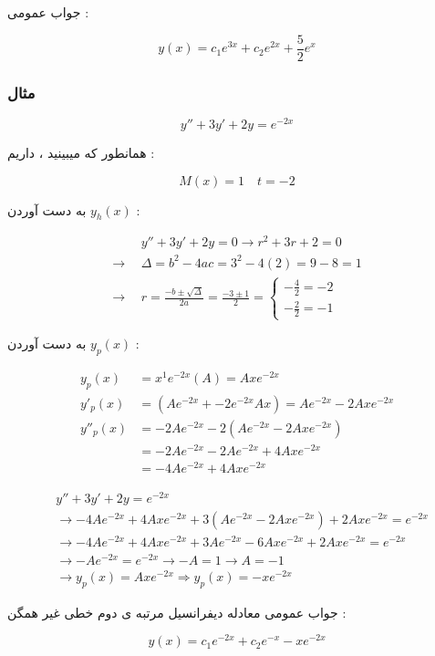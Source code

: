 \documentclass[12pt]{book}
\begin{document}
جواب عمومی :

$$
y(x) = c_{1}e^{3x} + c_{2}e^{2x} + \frac{5}{2}e^{x}
$$


\subsubsection{مثال}


$$
y'' + 3y' + 2y = e^{-2x} 
$$

همانطور که میبینید ، داریم : 

$$
M(x) = 1 \quad t = -2
$$

به دست آوردن 
$y_{h}(x)$ :


\begin{align*}
&y'' + 3y' + 2y = 0 \to r^{2} + 3r + 2 = 0 \\
\to \:\: &\Delta = b^{2} - 4ac = 3^{2} - 4(2) = 9 - 8 = 1 \\
\to \:\: &r = \frac{ -b \pm \sqrt{\Delta} }{ 2a } = \frac{-3 \pm 1}{2} = \begin{cases}
- \frac{4}{2} = -2 \\
- \frac{2}{2} = -1 
\end{cases}
\end{align*}


به دست آوردن 
$y_{p}(x)$ :

\begin{align*}
y_{p}(x) &= x^{1} e^{-2x} ( A ) = Axe^{-2x} \\
y'_{p}(x) &= (Ae^{-2x} + -2e^{-2x} Ax) = Ae^{-2x} - 2Axe^{-2x} \\
y''_{p}(x) &= -2Ae^{-2x} - 2 ( Ae^{-2x} - 2 Axe^{-2x}) \\
& = -2Ae^{-2x} - 2 A e^{-2x} + 4Axe^{-2x} \\
& = -4A e^{-2x} + 4Axe^{-2x} 
\end{align*}


\begin{align*}
&y'' + 3y' + 2y = e^{-2x} \\
&\to -4Ae^{-2x} + 4Axe^{-2x} + 3 ( Ae^{-2x} - 2Axe^{-2x} ) + 2Axe^{-2x} = e^{-2x} \\
&\to -4Ae^{-2x} + 4Axe^{-2x} + 3Ae^{-2x} - 6Axe^{-2x} + 2Axe^{-2x} = e^{-2x} \\
&\to -Ae^{-2x} = e^{-2x} \to - A = 1 \to A = -1 \\
&\to y_{p}(x) = Axe^{-2x} \Rightarrow y_{p}(x) = -xe^{-2x}
\end{align*}

جواب عمومی معادله دیفرانسیل مرتبه ی دوم خطی غیر همگن :

$$
y(x) = c_{1}e^{-2x} + c_{2}e^{-x} - xe^{-2x}
$$
\end{document}
